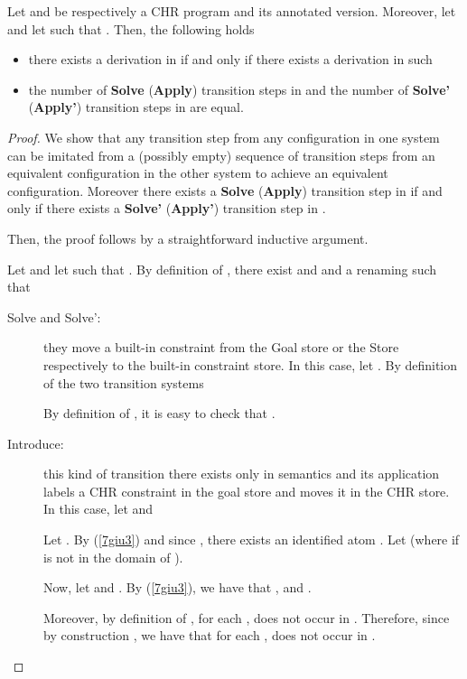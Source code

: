 \documentclass{tlp}
\begin{document}
\begin{lemma}\label{lemma:intermequiv}
Let  and  be respectively a CHR program and its annotated version.
Moreover, let
 and let   such that
.
Then, the following holds
\begin{itemize}
  \item there exists a derivation  in  if and only if
there exists a derivation  in  such  
  \item the number of \textbf{Solve} (\textbf{Apply}) transition steps in  and the number of \textbf{Solve'} (\textbf{Apply'}) transition steps in  are equal.
\end{itemize}
\end{lemma}
\begin{proof}
We show that any transition step from any configuration in one system can be imitated from a (possibly empty) sequence of  transition steps from an equivalent configuration in the other system to achieve an equivalent configuration.
 Moreover there exists a \textbf{Solve} (\textbf{Apply}) transition step in  if and only if there exists a  \textbf{Solve'} (\textbf{Apply'}) transition step in .

 Then, the proof follows by a straightforward inductive argument.

Let 
and let   such that
.
By definition of ,  there exist  and  and a renaming  such that


\begin{description}
\item[Solve and Solve':] they move a built-in constraint from the Goal store or the Store
respectively to the built-in constraint store. In this case, let . By definition of the two transition systems

By definition of , it is easy to check that .
\\

\item[Introduce:] this kind of transition there exists only in  semantics and its
application labels a CHR constraint in the goal store and moves it in the CHR store.
In this case, let  and



Let . By (\ref{7giu3}) and since ,
there exists an identified atom .
Let  (where  if  is not in the domain of ).

Now, let  and . By (\ref{7giu3}), we have that ,  and .

Moreover, by definition of , for each ,  does not occur in . Therefore, since by construction , we have that for each ,  does not occur in .


\end{description}
\end{proof}
\end{document}

